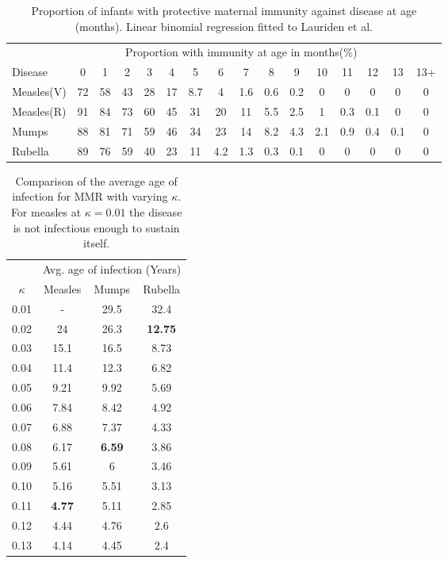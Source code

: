 \documentclass[a4paper,11pt] {scrartcl}
\begin{document}
\begin{table} [h]
\centering
\begin{tabular}{l c c c c c c c c c c c c c c c}
\toprule
& \multicolumn{14}{c}{Proportion with immunity at age in months(\%)} \ \\
Disease & 0 & 1 & 2 & 3 & 4 & 5 & 6 & 7 & 8 & 9 & 10 & 11 & 12 & 13 & 13+ \\
\midrule
Measles(V) & 72 & 58 & 43 & 28 & 17 & 8.7 & 4 & 1.6 & 0.6 & 0.2 & 0 & 0 & 0 & 0&0\\
Measles(R) & 91 & 84 & 73 & 60 & 45 & 31 & 20 & 11 & 5.5 & 2.5 & 1 & 0.3 & 0.1 & 0&0\\
Mumps & 88 & 81 & 71 & 59 & 46 & 34 & 23 & 14 & 8.2 & 4.3 & 2.1 & 0.9 & 0.4 & 0.1&0\\
Rubella & 89 & 76 & 59 & 40 & 23 & 11 & 4.2 & 1.3 & 0.3 & 0.1 & 0 & 0 & 0 & 0&0\\
\bottomrule
\end{tabular}
\caption{Proportion of infants with protective maternal immunity against disease at age (months). Linear binomial regression fitted to Lauriden et al.\cite{leuridan2010early,leuridan2011kinetics,leuridan2012maternal}}
\label{tab:estimateparametersmaternalimmunity}
\end{table}

\begin{table} [h]
\centering
\begin{tabular}{c c c c}
\toprule
& \multicolumn{3}{c}{Avg. age of infection (Years)}\\
$\kappa$ & Measles & Mumps & Rubella\\
\midrule
0.01 & - & 29.5 & 32.4\\
0.02 & 24 & 26.3 & \textbf{12.75}\\
0.03 & 15.1 & 16.5 & 8.73\\
0.04 & 11.4 & 12.3 & 6.82\\
0.05 & 9.21 & 9.92 & 5.69\\
0.06 & 7.84 & 8.42 & 4.92\\
0.07 & 6.88 & 7.37 & 4.33\\
0.08 & 6.17 & \textbf{6.59} & 3.86\\
0.09 & 5.61 & 6 & 3.46\\
0.10 & 5.16 & 5.51 & 3.13\\
0.11 & \textbf{4.77} & 5.11 & 2.85\\
0.12 & 4.44 & 4.76 & 2.6\\
0.13 & 4.14 & 4.45 & 2.4\\
\bottomrule
\end{tabular}
\caption{Comparison of the average age of infection for MMR with varying $\kappa$. For measles at $\kappa = 0.01$ the disease is not infectious enough to sustain itself.}
\label{tab:kappacomparison}
\end{table}
\end{document}
